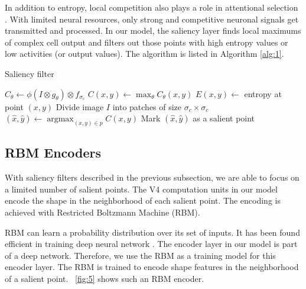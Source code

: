 \documentclass[conference]{IEEEtran}
\begin{document}
In addition to entropy, 
local competition also plays a role in attentional selection \cite{desimone1995}.
With limited neural resources, only strong and competitive neuronal signals get transmitted and processed.
In our model, the saliency layer finds local maximums of complex cell output
and filters out those points with high entropy values or low activities (or output values).
The algorithm is listed in Algorithm \ref{alg:1}.

\begin{algorithm}[htp]
  \caption{Saliency filter}
  \label{alg:1}
  \begin{algorithmic}[1]
        \State $C_{\theta}\leftarrow\phi(I\otimes g_{\theta})\otimes f_{\sigma_c}$
      \EndFor
        \State $C(x,y)\leftarrow\max_{\theta}C_{\theta}(x,y)$
        \State $E(x,y)\leftarrow$ entropy at point $(x,y)$
      \EndFor
      \State Divide image $I$ into patches of size $\sigma_c\times\sigma_c$
        \State $(\hat{x},\hat{y})\leftarrow\operatorname{argmax}_{(x,y)\in p}C(x,y)$
          \State Mark $(\hat{x},\hat{y})$ as a salient point
        \EndIf
      \EndFor
    \EndProcedure
  \end{algorithmic}
\end{algorithm}

\subsection{RBM Encoders}

With saliency filters described in the previous subsection,
we are able to focus on a limited number of salient points.
The V4 computation units in our model encode the shape in the neighborhood of each salient point.
The encoding is achieved with Restricted Boltzmann Machine (RBM).

RBM can learn a probability distribution over its set of inputs.
It has been found efficient in training deep neural network \cite{hinton2006}.
The encoder layer in our model is part of a deep network.
Therefore, we use the RBM as a training model for this encoder layer.
The RBM is trained to encode shape features in the neighborhood of a salient point.
\figurename~\ref{fig:5} shows such an RBM encoder.
\end{document}
